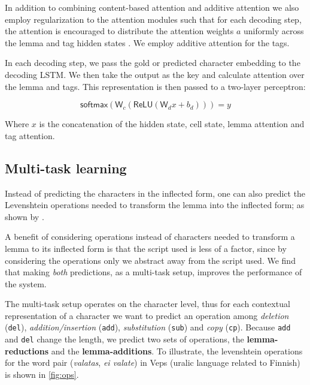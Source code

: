 \documentclass[11pt,a4paper]{article}
\begin{document}
In addition to combining content-based attention and additive
attention we also employ regularization to the attention modules such
that for each decoding step, the attention is encouraged to distribute
the attention weights $a$ uniformly across the lemma and tag hidden
states \cite{DBLP:conf/emnlp/AnastasopoulosN19,
DBLP:conf/naacl/CohnHVYDH16}. We employ additive attention for the tags.

In each decoding step, we pass the gold or predicted character embedding
to the decoding LSTM. We then take the output as the key and calculate
attention over the lemma and tags. This representation is then passed
to a two-layer perceptron:

\begin{equation*}
\mathsf{softmax}(\mathsf{W}_c(\mathsf{ReLU}(\mathsf{W}_dx+b_d))) = y
\end{equation*}

Where $x$ is the concatenation of the hidden state, cell state, lemma
attention and tag attention.


\subsection{Multi-task learning}

Instead of predicting the characters in the inflected form, one can
also predict the Levenshtein operations needed to transform the lemma
into the inflected form; as shown by
\cite{DBLP:conf/conll/MakarovRC17}.

A benefit of considering operations instead of characters needed to
transform a lemma to its inflected form is that the script used is
less of a factor, since by considering the operations only we abstract
away from the script used. We find that making \emph{both}
predictions, as a multi-task setup, improves the performance of the
system.

The multi-task setup operates on the character level, thus for each
contextual representation of a character we want to predict an
operation among \textit{deletion} (\texttt{del}),
\textit{addition/insertion} (\texttt{add}), \textit{substitution}
(\texttt{sub}) and \textit{copy} (\texttt{cp}). Because \texttt{add}
and \texttt{del} change the length, we predict two sets of operations,
the \textbf{lemma-reductions} and the \textbf{lemma-additions}. To
illustrate, the levenshtein operations for the word pair
(\emph{valatas}, \emph{ei valate}) in Veps (uralic language related to
Finnish) is shown in \cref{fig:ops}.
\end{document}
